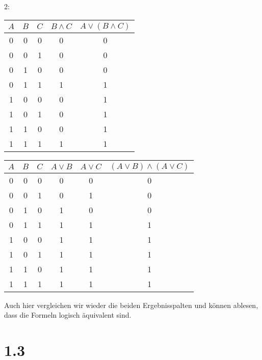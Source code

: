 \documentclass[12pt]{article}
\begin{document}
\newpage

2:

\begin{tabular}{|c|c|c|c||c|}
\hline
$A$ & $B$   & $C$   & $B \wedge C$    & $A \vee (B \wedge C)$  \\
\hline
\hline
0   &  0    & 0     &   0           &   0\\
0   &  0    & 1     &   0           &   0\\
0   &  1    & 0     &   0           &   0\\
0   &  1    & 1     &   1           &   1\\
1   &  0    & 0     &   0           &   1\\
1   &  0    & 1     &   0           &   1\\
1   &  1    & 0     &   0           &   1\\
1   &  1    & 1     &   1           &   1\\
\hline

\end{tabular}




\begin{tabular}{|c|c|c|c|c||c|}
\hline
$A$ & $B$   & $C$   & $A \vee B$  & $A \vee C$  & $(A \vee B) \wedge (A \vee C)$  \\
\hline
\hline
0   &  0    & 0     &   0           &   0           & 0 \\
0   &  0    & 1     &   0           &   1           & 0 \\
0   &  1    & 0     &   1           &   0           & 0 \\
0   &  1    & 1     &   1           &   1           & 1 \\
1   &  0    & 0     &   1           &   1           & 1 \\
1   &  0    & 1     &   1           &   1           & 1 \\
1   &  1    & 0     &   1           &   1           & 1 \\
1   &  1    & 1     &   1           &   1           & 1 \\
\hline

\end{tabular}

Auch hier vergleichen wir wieder die beiden Ergebnisspalten und können ablesen, dass die
Formeln logisch äquivalent sind.

\section*{1.3}
\end{document}
